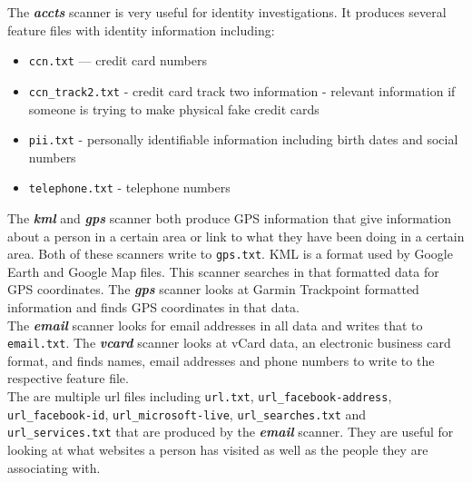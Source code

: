 \documentclass[11pt]{article} %
\begin{document}
The  \textbf{\textit{accts}} scanner is very useful for identity investigations. It produces several feature files with identity information including:
\begin{itemize}
\item \texttt{ccn.txt} --- credit card numbers
\item \texttt{ccn\_track2.txt} - credit card track two information -  relevant information if someone is trying to make physical fake credit cards
\item \texttt{pii.txt} - personally identifiable information including birth dates and social numbers
\item \texttt{telephone.txt} - telephone numbers
\end{itemize}

The  \textbf{\textit{kml}} and  \textbf{\textit{gps}} scanner both produce GPS information that give information about a person in a certain area or link to what they have been doing in a certain area. Both of these scanners write to \texttt{gps.txt}. KML is a format used by Google Earth and Google Map files. This scanner searches in that formatted data for GPS coordinates. The  \textbf{\textit{gps}} scanner looks at Garmin Trackpoint formatted information and finds GPS coordinates  in that data.\\

The  \textbf{\textit{email}} scanner looks for email addresses in all data and writes that to \texttt{email.txt}. The  \textbf{\textit{vcard}} scanner looks at vCard data, an electronic business card format, and finds names, email addresses and phone numbers to write to the respective feature file.\\

The are multiple url files including \texttt{url.txt}, \texttt{url\_facebook-address}, \texttt{url\_facebook-id}, \texttt{url\_microsoft-live}, \texttt{url\_searches.txt} and \texttt{url\_services.txt} that are produced by the \textbf{\textit{email}} scanner. They are useful for looking at what websites a person has visited as well as the people they are associating with.\\
\end{document}
